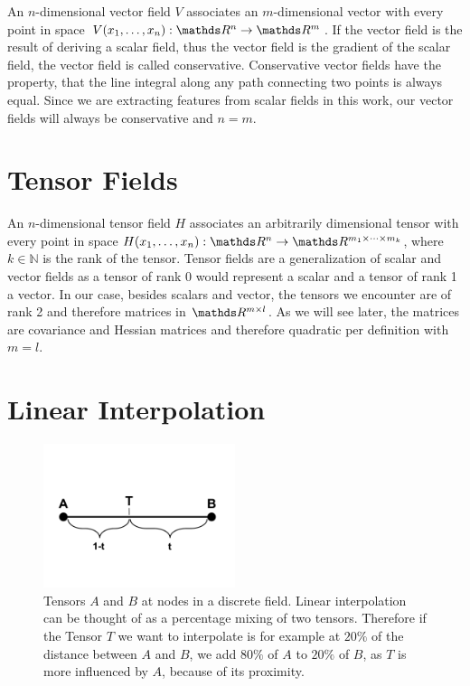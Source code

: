 An $n$-dimensional vector field $V$ associates an $m$-dimensional vector
with every point in space $V(x_1,\dots,x_n):\real^n \rightarrow \real^m$.
If the vector field is the result of deriving a scalar field, thus the 
vector field is the gradient of the scalar field, the vector field is
called conservative. Conservative vector fields have the property, that
the line integral along any path connecting two points is always equal.
Since we are extracting features from scalar fields in this work, our
vector fields will always be conservative and $n = m$.

\section{Tensor Fields}

An $n$-dimensional tensor field $H$ associates an arbitrarily
dimensional tensor with every point in space $H(x_1,\dots,x_n): \real^n
\rightarrow \real^{m_1 \times \cdots \times m_k}$, where $k \in
\mathbb{N}$ is the rank of the tensor. Tensor fields are a
generalization of scalar and vector fields as a tensor of rank 0 would
represent a scalar and a tensor of rank 1 a vector. In our case, besides
scalars and vector, the tensors we encounter are of rank 2 and therefore
matrices in $\real^ {m \times l}$. As we will see later, the matrices
are covariance and Hessian matrices and therefore quadratic per
definition with $m = l$.

\section{Linear Interpolation}

\begin{figure}
  \centering
  \includegraphics[width=0.5\textwidth]{Images/linipol.pdf}
  \caption{Tensors $A$ and $B$ at nodes in a discrete field. Linear
  interpolation can be thought of as a percentage mixing of two tensors.
  Therefore if the Tensor $T$ we want to interpolate is for
  example at $20\%$ of the distance between $A$ and $B$, we add $80\%$
  of $A$ to $20\%$ of $B$, as $T$ is more influenced by $A$,
  because of its proximity.}
  \label{fig:ipol}
\end{figure}

